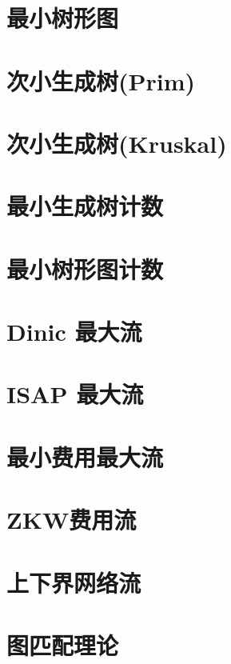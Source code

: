 \section{最小树形图}
\raggedbottom
\hrulefill
\section{次小生成树(Prim)}
\raggedbottom
\hrulefill
\section{次小生成树(Kruskal)}
\raggedbottom
\hrulefill
\section{最小生成树计数}
\raggedbottom
\hrulefill
\section{最小树形图计数}
\raggedbottom
\hrulefill
\section{Dinic 最大流}
\raggedbottom
\hrulefill
\section{	ISAP 最大流}
\raggedbottom
\hrulefill
\section{最小费用最大流}
\raggedbottom
\hrulefill
\section{ZKW费用流}
\raggedbottom
\hrulefill
\section{上下界网络流}
\raggedbottom
\hrulefill
\section{图匹配理论}
\raggedbottom
\hrulefill
